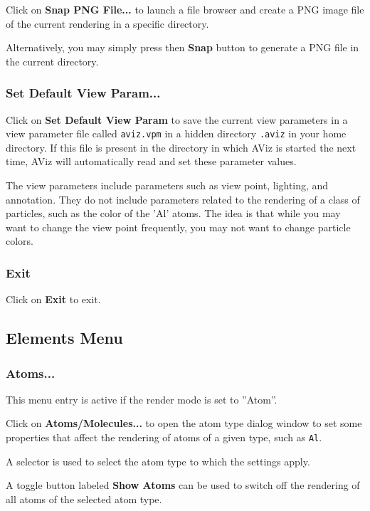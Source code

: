 \documentclass[11pt]{article}
\begin{document}
Click on {\bf Snap PNG File...} to launch a file browser and create a 
PNG image file of the current rendering in a specific directory. 

Alternatively, you may simply press then {\bf Snap} button to generate a 
PNG file in the current directory.

\subsubsection{Set Default View Param...}

Click on {\bf Set Default View Param } to save the current view parameters in a
view parameter file called {\tt aviz.vpm} in a hidden directory {\tt .aviz} in
your home directory. If this file is present in the directory in which AViz is
started the next time, AViz will automatically read and set these parameter
values.    

The view parameters include parameters such as view point, lighting, and 
annotation.  They do not include parameters related to the rendering of 
a class of particles, such as the color of the 'Al' atoms.  The idea is that
while you may want to change the view point frequently, you may not
want to change particle colors.

\subsubsection{Exit}

Click on {\bf Exit} to exit.

\subsection{Elements Menu}

\subsubsection{Atoms...}

This menu entry is active if the render mode is set to ''Atom''.  

Click on {\bf Atoms/Molecules...} to open the atom type dialog window to set
some properties that affect the rendering of atoms of a given type, such
as {\tt Al}.   

A selector is used to select the atom type to which the settings apply.

A toggle button labeled {\bf Show Atoms} can be used to switch off the 
rendering of all atoms of the selected atom type.
\end{document}
